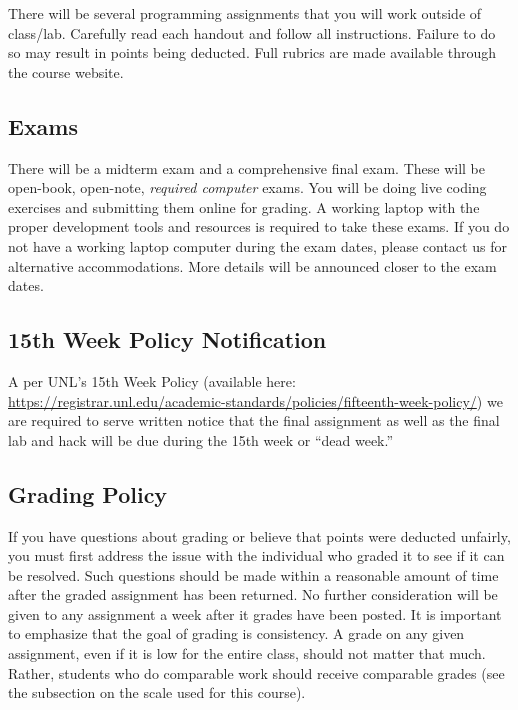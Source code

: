 \documentclass[12pt]{scrartcl}
\begin{document}
There will be several programming assignments that you will work outside
of class/lab.  Carefully read each handout and follow all instructions.
Failure to do so may result in points being deducted.  Full rubrics are
made available through the course website.  

\subsection{Exams}

There will be a midterm exam and a comprehensive final exam.  These
will be open-book, open-note, \emph{required computer} exams.  You
will be doing live coding exercises and submitting them online for
grading.  A working laptop with the proper development tools and
resources is required to take these exams.  If you do not have a 
working laptop computer during the exam dates, please contact us for
alternative accommodations.  More details will be announced closer 
to the exam dates.

\subsection{15th Week Policy Notification}
\label{subsection:deadweek}

A per UNL's 15th Week Policy (available here: \url{https://registrar.unl.edu/academic-standards/policies/fifteenth-week-policy/}) we are required
to serve written notice that the final assignment
as well as the final lab and hack will be due during the 15th 
week or ``dead week.''

\subsection{Grading Policy}

If you have questions about grading or believe that points were 
deducted unfairly, you must first address the issue with the 
individual who graded it to see if it can be resolved.  Such 
questions should be made within a reasonable amount of time 
after the graded assignment has been returned.  No further 
consideration will be given to any assignment a week after 
it grades have been posted.  It is important to emphasize that 
the goal of grading is consistency.  A grade on any given 
assignment, even if it is low for the entire class, should 
not matter that much.  Rather, students who do comparable 
work should receive comparable grades (see the subsection 
on the scale used for this course).
\end{document}
